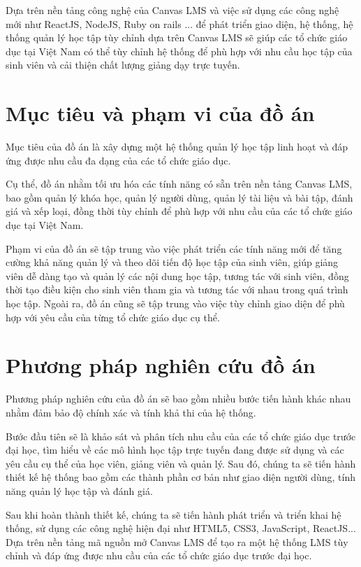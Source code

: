 \documentclass[../Thesis.tex]{subfiles}
\begin{document}
Dựa trên nền tảng công nghệ của Canvas LMS và việc sử dụng các công nghệ mới như ReactJS, NodeJS, Ruby on rails ... để phát triển giao diện, hệ thống, hệ thống quản lý học tập tùy chỉnh dựa trên Canvas LMS sẽ giúp các tổ chức giáo dục tại Việt Nam có thể tùy chỉnh hệ thống để phù hợp với nhu cầu học tập của sinh viên và cải thiện chất lượng giảng dạy trực tuyến.

\section{Mục tiêu và phạm vi của đồ án}

Mục tiêu của đồ án là xây dựng một hệ thống quản lý học tập linh hoạt và đáp ứng được nhu cầu đa dạng của các tổ chức giáo dục.

Cụ thể, đồ án nhằm tối ưu hóa các tính năng có sẵn trên nền tảng Canvas LMS, bao gồm quản lý khóa học, quản lý người dùng, quản lý tài liệu và bài tập, đánh giá và xếp loại, đồng thời tùy chỉnh để phù hợp với nhu cầu của các tổ chức giáo dục tại Việt Nam.

Phạm vi của đồ án sẽ tập trung vào việc phát triển các tính năng mới để tăng cường khả năng quản lý và theo dõi tiến độ học tập của sinh viên, giúp giảng viên dễ dàng tạo và quản lý các nội dung học tập, tương tác với sinh viên, đồng thời tạo điều kiện cho sinh viên tham gia và tương tác với nhau trong quá trình học tập. Ngoài ra, đồ án cũng sẽ tập trung vào việc tùy chỉnh giao diện để phù hợp với yêu cầu của từng tổ chức giáo dục cụ thể.
\section{Phương pháp nghiên cứu đồ án}
Phương pháp nghiên cứu của đồ án sẽ bao gồm nhiều bước tiến hành khác nhau nhằm đảm bảo độ chính xác và tính khả thi của hệ thống.

Bước đầu tiên sẽ là khảo sát và phân tích nhu cầu của các tổ chức giáo dục trước đại học, tìm hiểu về các mô hình học tập trực tuyến đang được sử dụng và các yêu cầu cụ thể của học viên, giảng viên và quản lý. Sau đó, chúng ta sẽ tiến hành thiết kế hệ thống bao gồm các thành phần cơ bản như giao diện người dùng, tính năng quản lý học tập và đánh giá.

Sau khi hoàn thành thiết kế, chúng ta sẽ tiến hành phát triển và triển khai hệ thống, sử dụng các công nghệ hiện đại như HTML5, CSS3, JavaScript, ReactJS... Dựa trên nền tảng mã nguồn mở Canvas LMS để tạo ra một hệ thống LMS tùy chỉnh và đáp ứng được nhu cầu của các tổ chức giáo dục trước đại học.
\end{document}

